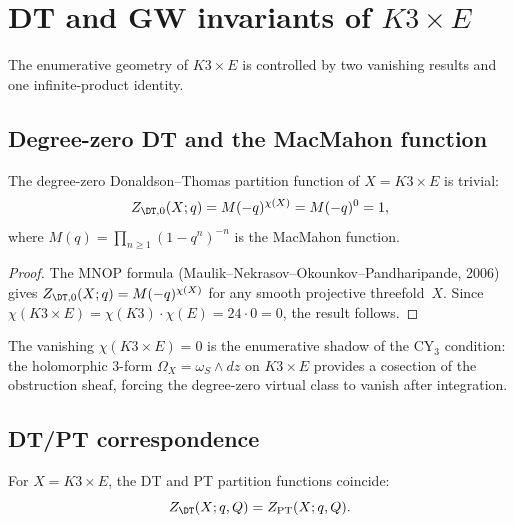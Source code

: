 
\section{DT and GW invariants of \texorpdfstring{$K3 \times E$}{K3 x E}}
\label{sec:k3e-dt-gw}

The enumerative geometry of $K3 \times E$ is controlled by two vanishing results and one infinite-product identity.

\subsection{Degree-zero DT and the MacMahon function}
\label{subsec:k3e-dt-degree0}

\begin{theorem}
\label{thm:k3e-dt-degree0}
The degree-zero Donaldson--Thomas partition function of $X = K3 \times E$ is trivial:
\[
 Z_{\DT,0}(X; q) = M(-q)^{\chi(X)} = M(-q)^0 = 1,
\]
where $M(q) = \prod_{n \geq 1}(1 - q^n)^{-n}$ is the MacMahon function.
\end{theorem}

\begin{proof}
The MNOP formula (Maulik--Nekrasov--Okounkov--Pandharipande, 2006) gives $Z_{\DT,0}(X; q) = M(-q)^{\chi(X)}$ for any smooth projective threefold~$X$. Since $\chi(K3 \times E) = \chi(K3) \cdot \chi(E) = 24 \cdot 0 = 0$, the result follows.
\end{proof}

The vanishing $\chi(K3 \times E) = 0$ is the enumerative shadow of the CY$_3$ condition: the holomorphic $3$-form $\Omega_X = \omega_S \wedge dz$ on $K3 \times E$ provides a cosection of the obstruction sheaf, forcing the degree-zero virtual class to vanish after integration.

\subsection{DT/PT correspondence}
\label{subsec:k3e-dt-pt}

\begin{theorem}[DT/PT identity]
\label{thm:k3e-dt-pt}
For $X = K3 \times E$, the DT and PT partition functions coincide:
\[
 Z_{\DT}(X; q, Q) = Z_{\mathrm{PT}}(X; q, Q).
\]
\end{theorem}

